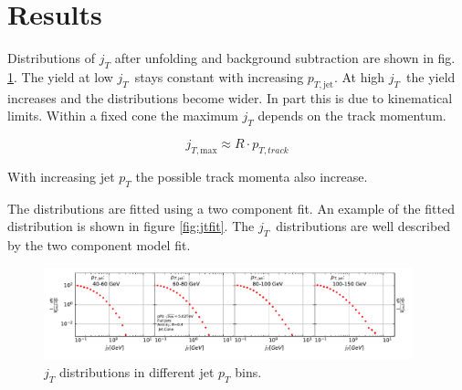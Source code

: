 %

\section{Results}
\label{sec:results}

Distributions of $j_T$ after unfolding and background subtraction are shown in fig. \ref{fig:jtdist}. The yield at low $j_T$ stays constant with increasing $p_{T,\mathrm{jet}}$. At high $j_T$ the yield increases and the distributions become wider. In part this is due to kinematical limits. Within a fixed cone the maximum $j_T$ depends on the track momentum. 

$$j_{T,\mathrm{max}} \approx R \cdot p_{T,track} $$

With increasing jet $p_T$ the possible track momenta also increase.

The distributions are fitted using a two component fit. An example of the fitted distribution is shown in figure \ref{fig:jtfit}. The $j_T$ distributions are well described by the two component model fit. 

\begin{figure}[htb]
\begin{center}
\includegraphics[width=0.95\textwidth]{figures/results/MixedFullJetsR04JetConeJtSignalPtFrom4To8.pdf}
\caption{$j_T$ distributions in different jet $p_T$ bins.}
\label{fig:jtdist}
\end{center}
\end{figure}

